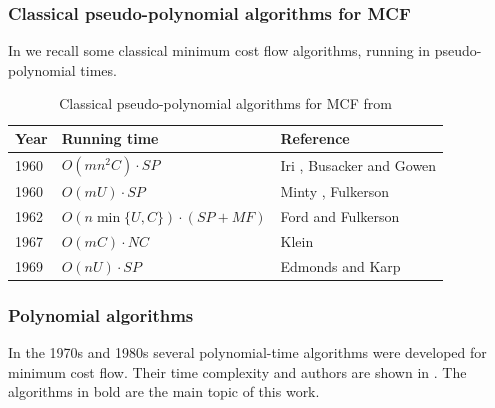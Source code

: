 \subsubsection{Classical pseudo-polynomial algorithms for MCF}
In  we recall some classical minimum cost flow algorithms, running in pseudo-polynomial times.
\begin{table}[ht!]
\centering
\begin{tabular}{@{}lll@{}}
\toprule
\textbf{Year}       & \textbf{Running time}          & \textbf{Reference}  \\        
\midrule
1960      & \(O(mn^2C) \cdot SP\)               & Iri \cite{iri1960}, Busacker and Gowen \cite{busacker1960} \\
1960      & \(O(mU)\cdot SP\) & Minty \cite{minty1960}, Fulkerson \cite{fulkerson1960} \\
1962 & \(O(n \min \{U,C\}) \cdot (SP+MF)\) & Ford and Fulkerson \cite{ford1962} \\
1967 & \(O(mC) \cdot NC \) & Klein \cite{klein1967} \\
1969 & \(O(nU) \cdot SP\) & Edmonds and Karp \cite{edmonds1969} \\
\bottomrule
\end{tabular}

\caption{Classical pseudo-polynomial algorithms for MCF from \cite{algorithms-survey}}
\label{tab:classical}
\end{table}

\subsubsection{Polynomial algorithms}
In the 1970s and 1980s several polynomial-time algorithms were developed for minimum cost flow. Their time complexity and authors are shown in . The algorithms in bold are the main topic of this work. 

